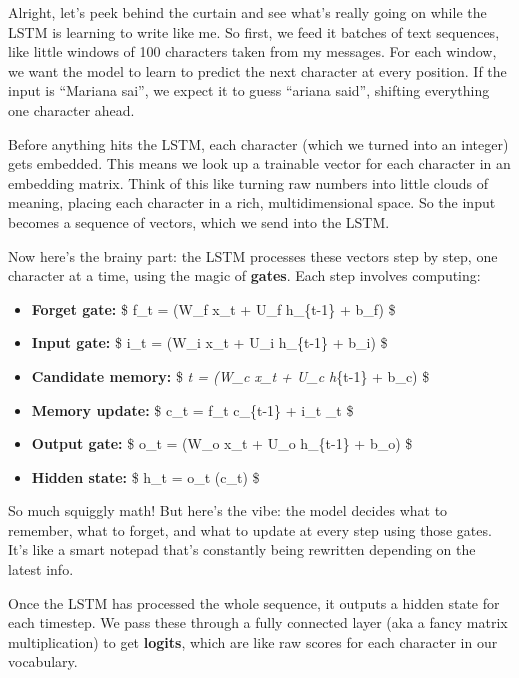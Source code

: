 \documentclass[11pt]{article}
\providecommand{\tightlist}{%
      \setlength{\itemsep}{0pt}\setlength{\parskip}{0pt}}
\begin{document}
Alright, let's peek behind the curtain and see what's really going on
while the LSTM is learning to write like me. So first, we feed it
batches of text sequences, like little windows of 100 characters taken
from my messages. For each window, we want the model to learn to predict
the next character at every position. If the input is ``Mariana sai'',
we expect it to guess ``ariana said'', shifting everything one character
ahead.

Before anything hits the LSTM, each character (which we turned into an
integer) gets embedded. This means we look up a trainable vector for
each character in an embedding matrix. Think of this like turning raw
numbers into little clouds of meaning, placing each character in a rich,
multidimensional space. So the input becomes a sequence of vectors,
which we send into the LSTM.

Now here's the brainy part: the LSTM processes these vectors step by
step, one character at a time, using the magic of \textbf{gates}. Each
step involves computing:

\begin{itemize}
\tightlist
\item
  \textbf{Forget gate:} \$ f\_t = \sigma(W\_f x\_t + U\_f h\_\{t-1\} +
  b\_f) \$\\
\item
  \textbf{Input gate:} \$ i\_t = \sigma(W\_i x\_t + U\_i h\_\{t-1\} +
  b\_i) \$\\
\item
  \textbf{Candidate memory:} \$ \emph{t = \tanh(W\_c x\_t +
  U\_c h}\{t-1\} + b\_c) \$\\
\item
  \textbf{Memory update:} \$ c\_t = f\_t \odot c\_\{t-1\} + i\_t
  \odot {}\_t \$
\item
  \textbf{Output gate:} \$ o\_t = \sigma(W\_o x\_t + U\_o h\_\{t-1\} +
  b\_o) \$
\item
  \textbf{Hidden state:} \$ h\_t = o\_t \odot \tanh(c\_t) \$
\end{itemize}

So much squiggly math! But here's the vibe: the model decides what to
remember, what to forget, and what to update at every step using those
gates. It's like a smart notepad that's constantly being rewritten
depending on the latest info.

Once the LSTM has processed the whole sequence, it outputs a hidden
state for each timestep. We pass these through a fully connected layer
(aka a fancy matrix multiplication) to get \textbf{logits}, which are
like raw scores for each character in our vocabulary.
\end{document}
